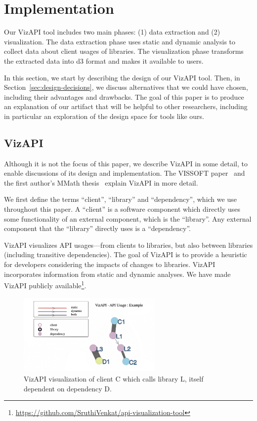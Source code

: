 \section{Implementation}
\label{sec:implementation}
Our VizAPI tool includes two main phases: (1) data extraction and (2)
visualization. The data extraction phase uses static and dynamic
analysis to collect data about client usages of libraries. The
visualization phase transforms the extracted data into d3 format and makes it
available to users.

In this section, we start by describing the design of our VizAPI
tool. Then, in Section~\ref{sec:design-decisions}, we discuss
alternatives that we could have chosen, including their advantages and
drawbacks.  The goal of this paper is to produce an explanation of our
artifact that will be helpful to other researchers, including in
particular an exploration of the design space for tools like ours.

\subsection{VizAPI}
Although it is not the focus of this paper, we describe VizAPI
in some detail, to enable discussions of its design and implementation.
The VISSOFT paper~\cite{venkatanarayanan22:_vizap}
and the first author's MMath thesis~\cite{venkatanarayanan22:_study_lever_api_usage_patter} explain VizAPI in more detail.

We first define the terms ``client'', ``library'' and ``dependency'', which we use throughout this paper. A ``client'' is a software component which directly uses some functionality of an external component, which is the ``library''. Any external component that the ``library'' directly uses is a ``dependency''. 

VizAPI visualizes API usages---from clients to libraries, but also between libraries (including transitive dependencies). The goal of VizAPI is to provide a heuristic for developers considering the impacts of changes to libraries. VizAPI incorporates information from static and dynamic analyses.  We have made VizAPI publicly available\footnote{\url{https://github.com/SruthiVenkat/api-visualization-tool}}.

\begin{figure}[h]
\begin{center}
\includegraphics[height=4cm,width=7cm]{images/intro-example.png}
\caption{VizAPI visualization of client C which calls library L, itself dependent on dependency D.}
\label{fig:example}
\end{center}
\end{figure}

